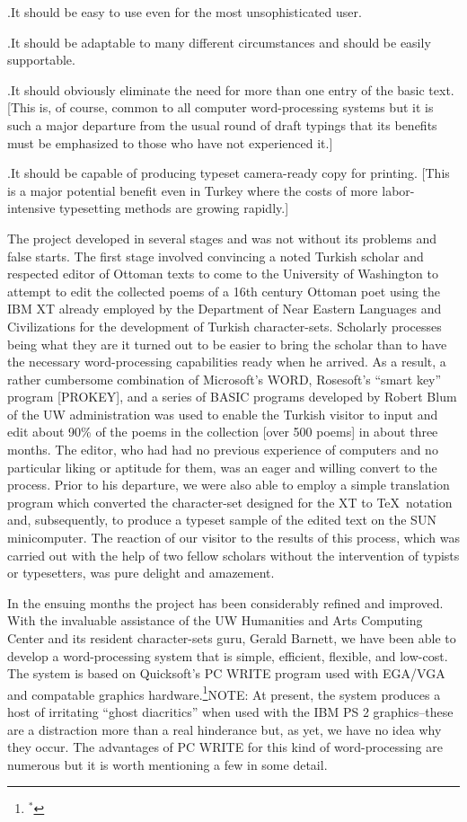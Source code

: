 \medskip
{}.\quad It should be easy to use even for the most
unsophisticated user.

.\quad It should be adaptable to many different
circumstances and should be easily supportable.

.\quad It should obviously eliminate the need for
more than one entry of the basic text.  [This is, of
course, common to all computer word-processing systems
but it is such a major departure from the usual round of
draft typings that its benefits must be emphasized to
those who have not experienced it.]

.\quad  It should be capable of producing typeset
camera-ready copy for printing. [This is a major
potential benefit even in Turkey where the costs of more
labor-intensive typesetting methods are growing rapidly.]

\medskip

        The project developed in several stages and was
not without its problems and false starts.  The first
stage involved convincing a noted Turkish scholar and
respected editor of Ottoman texts to come to the
University of Washington to attempt to edit the collected
poems of a 16th century Ottoman poet using the IBM XT
already employed by the Department of Near Eastern
Languages and Civilizations for the development of
Turkish character-sets.  Scholarly processes being what
they are it turned out to be easier to bring the scholar
than to have the necessary word-processing capabilities
ready when he arrived.  As a result, a rather cumbersome
combination of Microsoft's WORD, Rosesoft's ``smart key''
program [PROKEY], and a series of BASIC programs
developed by Robert Blum of the UW administration was
used to enable the Turkish visitor to input and edit
about 90\% of the poems in the collection [over 500 poems]
in about three months.  The editor, who had had no
previous experience of computers and no particular liking
or aptitude for them, was an eager and willing convert to
the process.  Prior to his departure, we were also able
to employ a simple translation program which converted
the character-set designed for the XT to \TeX\ notation
and, subsequently, to produce a typeset sample of the
edited text on the SUN
minicomputer.  The reaction of our visitor to the
results of this process, which was carried out with the
help of two fellow scholars without the intervention of
typists or typesetters, was pure delight and amazement.

        In the ensuing months the project has been
considerably refined and improved.  With the invaluable
assistance of the UW Humanities and Arts Computing
Center and its resident character-sets guru, Gerald
Barnett, we have been able to develop a word-processing
system that is simple, efficient, flexible, and low-cost.
The system is based on Quicksoft's PC WRITE program used
with EGA/VGA and compatable graphics hardware.\footnote{$^*$}{NOTE: At
present, the system produces a host of irritating ``ghost
diacritics'' when used with the IBM PS 2 graphics--these
are a distraction more than a real hinderance but, as
yet, we have no idea why they occur.}  The advantages of
PC WRITE for this kind of word-processing are numerous
but it is worth mentioning a few in some detail.

